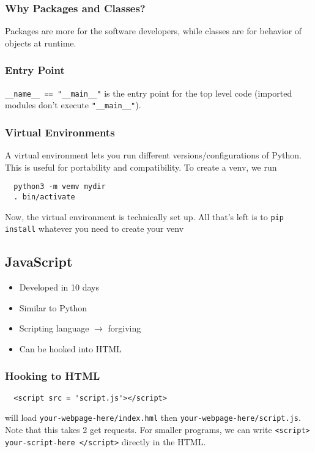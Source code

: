 \documentclass[13pt]{article}
\begin{document}
\subsubsection{Why Packages and Classes?}
Packages are more for the software developers, while classes are for behavior of objects at runtime.

\subsubsection{Entry Point}
\texttt{\_\_name\_\_ == "\_\_main\_\_"} is the entry point for the top level code (imported modules don't execute \texttt{"\_\_main\_\_"}).

\subsubsection{Virtual Environments}
A virtual environment lets you run different versions/configurations of Python. This is useful for portability and compatibility. To create a venv, we run
\begin{verbatim}
  python3 -m vemv mydir
  . bin/activate
\end{verbatim}
Now, the virtual environment is technically set up. All that's left is to \texttt{pip install} whatever you need to create your venv

\subsection{JavaScript}
\begin{itemize}[leftmargin = 0pt]
\item [] Developed in 10 days
\item [] Similar to Python
\item [] Scripting language $\rightarrow$ forgiving
\item [] Can be hooked into HTML
\end{itemize}
\subsubsection{Hooking to HTML}
\begin{verbatim}
  <script src = 'script.js'></script>
\end{verbatim}
will load \texttt{your-webpage-here/index.hml} then \texttt{your-webpage-here/script.js}. Note that this takes 2 get requests. For smaller programs, we can write \texttt{<script> your-script-here </script>} directly in the HTML. 
\end{document}

